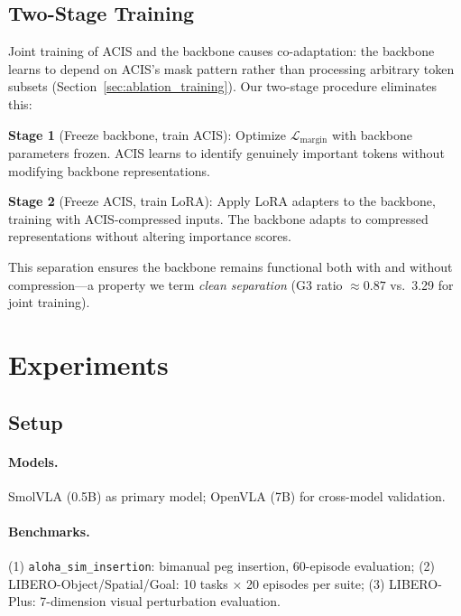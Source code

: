 \documentclass[conference]{corl_2026}
\newcommand{\acis}{ACIS}
\begin{document}
\subsection{Two-Stage Training}
\label{sec:two_stage}

Joint training of \acis{} and the backbone causes co-adaptation: the backbone learns to depend on \acis{}'s mask pattern rather than processing arbitrary token subsets (Section~\ref{sec:ablation_training}). Our two-stage procedure eliminates this:

\textbf{Stage 1} (Freeze backbone, train \acis{}): Optimize $\mathcal{L}_{\text{margin}}$ with backbone parameters frozen. \acis{} learns to identify genuinely important tokens without modifying backbone representations.

\textbf{Stage 2} (Freeze \acis{}, train LoRA): Apply LoRA adapters to the backbone, training with \acis{}-compressed inputs. The backbone adapts to compressed representations without altering importance scores.

This separation ensures the backbone remains functional both with and without compression---a property we term \emph{clean separation} (G3 ratio $\approx 0.87$ vs.\ 3.29 for joint training).

\section{Experiments}
\label{sec:experiments}

\subsection{Setup}

\paragraph{Models.} SmolVLA (0.5B) as primary model; OpenVLA (7B) for cross-model validation.

\paragraph{Benchmarks.} (1) \texttt{aloha\_sim\_insertion}: bimanual peg insertion, 60-episode evaluation; (2) LIBERO-Object/Spatial/Goal: 10 tasks $\times$ 20 episodes per suite; (3) LIBERO-Plus: 7-dimension visual perturbation evaluation.
\end{document}
